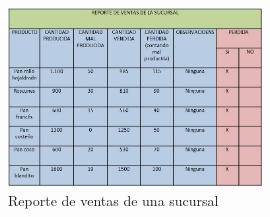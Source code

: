 \\%
\\%
\\%
\\%
\begin{figure}[htbp]
	\centering
		\includegraphics[width=0.60\textwidth]{images/REPORTEDEVENTASDELASUCURSAL.jpg}
	\caption{Reporte de ventas de una sucursal}
	\label{fig:Reporte de ventas de una sucursal}
\end{figure}%
\newpage%

